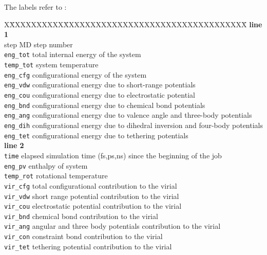 The labels refer to :
\begin{tabbing}
X\=XXXXXXXXXX\=XXXXXXXXXXXXXXXXXXXXXXXXXXXXXXXXXX\=\kill
{\bf line 1}\\
\>step \> MD step number\\
\> {\tt eng\_tot} \> total internal energy of the system\\
\> {\tt temp\_tot} \> system temperature\\
\> {\tt eng\_cfg} \> configurational energy of the system\\
\> {\tt eng\_vdw} \> configurational energy due to short-range
potentials\\
\> {\tt eng\_cou} \> configurational energy due to electrostatic
potential \\
\> {\tt eng\_bnd} \> configurational energy due to chemical bond
potentials\\
\> {\tt eng\_ang} \> configurational energy due to valence angle
and three-body potentials\\
\> {\tt eng\_dih} \> configurational energy due to dihedral
inversion and four-body potentials\\
\> {\tt eng\_tet} \> configurational energy due to tethering
potentials\\
{\bf line 2}\\
\> {\tt time} \> elapsed simulation time (fs,ps,ns) since the beginning
of the job\\
\> {\tt eng\_pv} \> enthalpy of system\\
\> {\tt temp\_rot} \> rotational temperature\\
\> {\tt vir\_cfg} \> total configurational contribution to the
virial\\
\> {\tt vir\_vdw} \> short range potential contribution to the
virial\\
\> {\tt vir\_cou} \> electrostatic potential contribution to the
virial\\
\> {\tt vir\_bnd} \> chemical bond contribution to the virial\\
\> {\tt vir\_ang} \> angular and three body potentials contribution to
the virial\\
\> {\tt vir\_con} \> constraint bond contribution to the virial\\
\> {\tt vir\_tet} \> tethering potential contribution to the virial\\

\end{tabbing}
